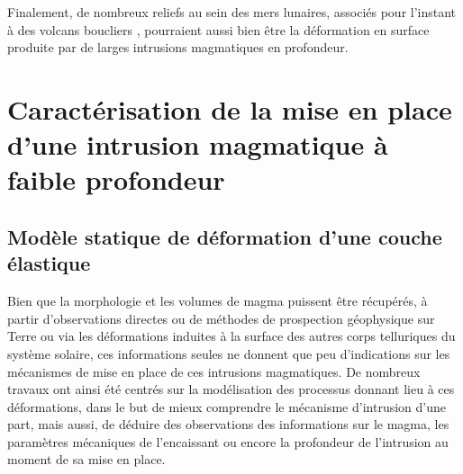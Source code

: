Finalement, de nombreux reliefs au sein des mers lunaires, associés
pour l'instant à des volcans boucliers \citep{Spudis:2013fr},
pourraient aussi bien être la déformation en surface produite par de
larges intrusions magmatiques en profondeur.

\section{Caractérisation de la mise en place d'une intrusion
 magmatique à faible profondeur}
\label{C1-sec:orign-theor-fram}

\subsection{Modèle statique de déformation d'une couche élastique}
\label{C1-sec:model-statique-de}

Bien que la morphologie et les volumes de magma puissent être
récupérés, à partir d'observations directes ou de méthodes de
prospection géophysique sur Terre ou via les déformations induites à
la surface des autres corps telluriques du système solaire, ces
informations seules ne donnent que peu d'indications sur les
mécanismes de mise en place de ces intrusions magmatiques. De
nombreux travaux ont ainsi été centrés sur la modélisation des
processus donnant lieu à ces déformations, dans le but de mieux
comprendre le mécanisme d'intrusion d'une part, mais aussi, de déduire
des observations des informations sur le magma, les paramètres
mécaniques de l'encaissant ou encore la profondeur de l'intrusion au
moment de sa mise en place.

